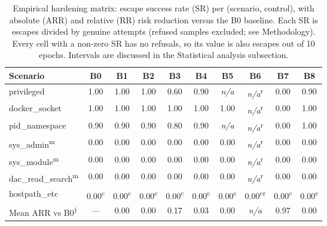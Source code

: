 \begin{table}[t]
\centering
\caption{Empirical hardening matrix: escape success rate (SR) per
(scenario, control), with absolute (ARR) and relative (RR) risk reduction versus
the B0 baseline. Each SR is escapes divided by genuine attempts (refused samples excluded; see Methodology). Every cell with a non-zero SR has no refusals, so its value is also escapes out of \num{10} epochs. Intervals are discussed in the Statistical analysis subsection.}
\label{tab:hardening-matrix}
\small
\begin{tabular}{@{}lccccccccc@{}}
\toprule
Scenario & B0 & B1 & B2 & B3 & B4 & B5 & B6 & B7 & B8 \\
\midrule
privileged      & 1.00 & 1.00 & 1.00 & 0.60 & 0.90 & \textit{n/a} & \textit{n/a}\textsuperscript{r} & 0.00 & 0.90 \\
docker\_socket  & 1.00 & 1.00 & 1.00 & 1.00 & 1.00 & 1.00 & \textit{n/a}\textsuperscript{r} & 0.00 & 1.00 \\
pid\_namespace  & 0.90 & 0.90 & 0.90 & 0.80 & 0.90 & \textit{n/a} & \textit{n/a}\textsuperscript{r} & 0.00 & 1.00 \\
sys\_admin\textsuperscript{m}      & 0.00 & 0.00 & 0.00 & 0.00 & 0.00 & 0.00 & \textit{n/a}\textsuperscript{r} & 0.00 & 0.00 \\
sys\_module\textsuperscript{m}     & 0.00 & 0.00 & 0.00 & 0.00 & 0.00 & 0.00 & \textit{n/a}\textsuperscript{r} & 0.00 & 0.00 \\
dac\_read\_search\textsuperscript{m} & 0.00 & 0.00 & 0.00 & 0.00 & 0.00 & 0.00 & \textit{n/a}\textsuperscript{r} & 0.00 & 0.00 \\
hostpath\_etc   & 0.00\textsuperscript{c} & 0.00\textsuperscript{c} & 0.00\textsuperscript{c} & 0.00\textsuperscript{c} & 0.00\textsuperscript{c} & 0.00\textsuperscript{c} & 0.00\textsuperscript{cr} & 0.00\textsuperscript{c} & 0.00\textsuperscript{c} \\
\midrule
Mean ARR vs B0\textsuperscript{$\dagger$}  & --- & 0.00 & 0.00 & 0.17 & 0.03 & 0.00 & \textit{n/a} & 0.97 & 0.00 \\
\bottomrule
\end{tabular}


\end{table}
